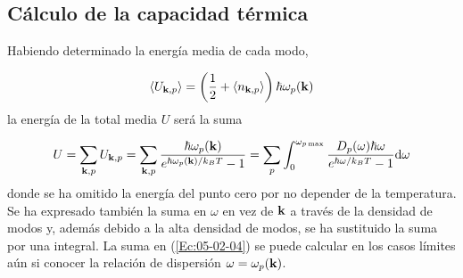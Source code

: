 \subsection{Cálculo de la capacidad térmica}

Habiendo determinado la energía media de cada modo,

\begin{equation*}
    \langle U_{\mathbf{k},p} \rangle = \left( \frac{1}{2} + \langle n_{\mathbf{k},p} \rangle  \right) \hbar \omega_p (\mathbf{k})  
\end{equation*}
la energía de la total media $U$ será la suma 

\begin{equation}
    U = \sum_{\mathbf{k},p} U_{\mathbf{k},p} = \sum_{\mathbf{k},p} \frac{\hbar \omega_p (\mathbf{k})}{e^{\hbar \omega_p (\mathbf{k})/k_B T} - 1} = \sum_p \int_{0}^{\omega_{p \max}} \frac{D_p (\omega) \hbar \omega}{e^{\hbar \omega/ k_B T} - 1} \mathrm{d} \omega  \label{Ec:05-02-04}
\end{equation}
donde se ha omitido la energía del punto cero por no depender de la temperatura. Se ha expresado también la suma en $\omega$ en vez de $\mathbf{k}$ a través de la densidad de modos y, además debido a la alta densidad de modos, se ha sustituido la suma por una integral. La suma en (\ref{Ec:05-02-04}) se puede calcular en los casos límites aún si conocer la relación de dispersión $\omega=\omega_p (\mathbf{k})$. 

